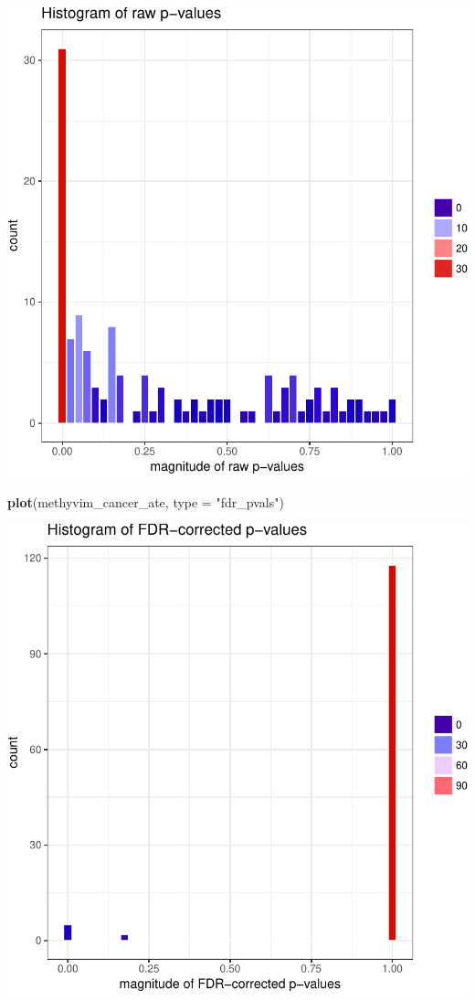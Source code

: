 \documentclass[9pt,a4paper,]{extarticle}
\newenvironment{Shaded}{\begin{snugshade}}{\end{snugshade}}
\newcommand{\DataTypeTok}[1]{\textcolor[rgb]{0.13,0.29,0.53}{#1}}
\newcommand{\KeywordTok}[1]{\textcolor[rgb]{0.13,0.29,0.53}{\textbf{#1}}}
\newcommand{\NormalTok}[1]{#1}
\newcommand{\StringTok}[1]{\textcolor[rgb]{0.31,0.60,0.02}{#1}}
\theoremstyle{definition}
\theoremstyle{definition}
\theoremstyle{definition}
\theoremstyle{remark}
\begin{document}
\begin{center}\includegraphics{paper_BiocF1000_files/figure-latex/methyvim-pvals-raw-1} \end{center}

\begin{Shaded}
\begin{Highlighting}[]
\KeywordTok{plot}\NormalTok{(methyvim_cancer_ate, }\DataTypeTok{type =} \StringTok{"fdr_pvals"}\NormalTok{)}
\end{Highlighting}
\end{Shaded}

\begin{center}\includegraphics{paper_BiocF1000_files/figure-latex/methyvim-pvals-fdr-1} \end{center}
\end{document}
